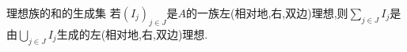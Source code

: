 \begin{proposition}{理想族的和的生成集}{}
	若$\left(I_{j}\right)_{j\in J}$是$A$的一族左(相对地,右,双边)理想,则$\sum\limits_{j\in J}I_{j}$是由$\bigcup\limits_{j\in J}I_{j}$生成的左(相对地,右,双边)理想.
\end{proposition}


































































